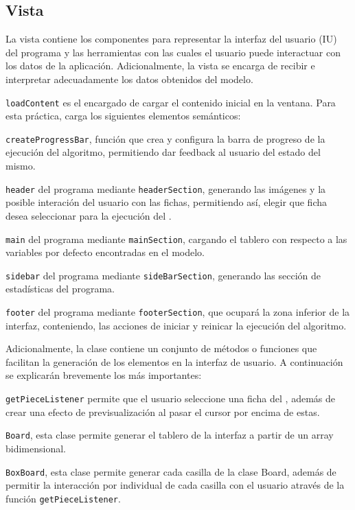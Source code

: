 \subsection{Vista}

La vista contiene los componentes para representar la interfaz del usuario (IU) del programa y las herramientas con las cuales el usuario puede interactuar con los datos de la aplicación. Adicionalmente, la vista se encarga de recibir e interpretar adecuadamente los datos obtenidos del modelo.\bigskip

\texttt{loadContent} es el encargado de cargar el contenido inicial en la ventana. Para esta práctica, carga los siguientes elementos semánticos:\bigskip

\texttt{createProgressBar}, función que crea y configura la barra de progreso de la ejecución del algoritmo, permitiendo dar feedback al usuario del estado del mismo.

\texttt{header} del programa mediante \texttt{headerSection}, generando las imágenes y la posible interación del usuario con las fichas, permitiendo así, elegir que ficha desea seleccionar para la ejecución del .\bigskip

\texttt{main} del programa mediante \texttt{mainSection}, cargando el tablero con respecto a las variables por defecto encontradas en el modelo.\bigskip

\texttt{sidebar} del programa mediante \texttt{sideBarSection}, generando las sección de estadísticas del programa.\bigskip

\texttt{footer} del programa mediante \texttt{footerSection}, que ocupará la zona inferior de la interfaz, conteniendo, las acciones de iniciar y reinicar la ejecución del algoritmo.\bigskip

Adicionalmente, la clase contiene un conjunto de métodos o funciones que facilitan la generación de los elementos en la interfaz de usuario. A continuación se explicarán brevemente los más importantes:\bigskip

\texttt{getPieceListener} permite que el usuario seleccione una ficha del , además de crear una efecto de previsualización al pasar el cursor por encima de estas.\bigskip

\texttt{Board}, esta clase permite generar el tablero de la interfaz a partir de un array bidimensional.\bigskip

\texttt{BoxBoard}, esta clase permite generar cada casilla de la clase Board, además de permitir la interacción por individual de cada casilla con el usuario através de la función \texttt{getPieceListener}.\bigskip
